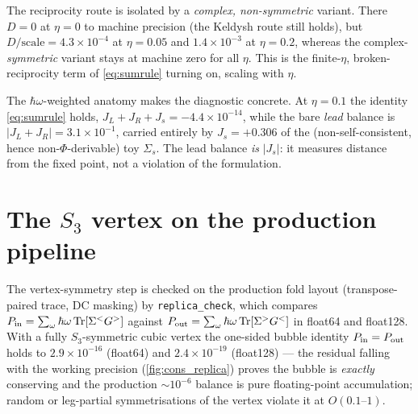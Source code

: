 The reciprocity route is isolated by a \emph{complex, non-symmetric} variant.
There $D=0$ at $\eta=0$ to machine precision (the Keldysh route still holds),
but $D/\text{scale}=4.3\times10^{-4}$ at $\eta=0.05$ and $1.4\times10^{-3}$ at
$\eta=0.2$, whereas the complex-\emph{symmetric} variant stays at machine zero
for all $\eta$. This is the finite-$\eta$, broken-reciprocity term of
\cref{eq:sumrule} turning on, scaling with $\eta$.

The $\hbar\omega$-weighted anatomy makes the diagnostic concrete. At $\eta=0.1$
the identity \cref{eq:sumrule} holds, $J_L+J_R+J_s=-4.4\times10^{-14}$, while
the bare \emph{lead} balance is $|J_L+J_R|=3.1\times10^{-1}$, carried entirely
by $J_s=+0.306$ of the (non-self-consistent, hence non-$\Phi$-derivable) toy
$\Sigma_s$. The lead balance \emph{is} $|J_s|$: it measures distance from the
fixed point, not a violation of the formulation.

\section{The \texorpdfstring{$S_3$}{S3} vertex on the production pipeline}
\label{sec:cons_s3}

The vertex-symmetry step is checked on the production fold layout
(transpose-paired trace, DC masking) by \texttt{replica\_check}, which compares
$P_{\rm in}=\sum_\omega\hbar\omega\,\mathrm{Tr}[\Sigma^<G^>]$ against
$P_{\rm out}=\sum_\omega\hbar\omega\,\mathrm{Tr}[\Sigma^>G^<]$ in float64 and
float128. With a fully $S_3$-symmetric cubic vertex the one-sided bubble
identity $P_{\rm in}=P_{\rm out}$ holds to $2.9\times10^{-16}$ (float64) and
$2.4\times10^{-19}$ (float128) --- the residual falling with the working
precision (\cref{fig:cons_replica}) proves the bubble is \emph{exactly}
conserving and the production $\sim10^{-6}$ balance is pure floating-point
accumulation; random or leg-partial symmetrisations of the vertex violate it at
$O(0.1\text{--}1)$.

